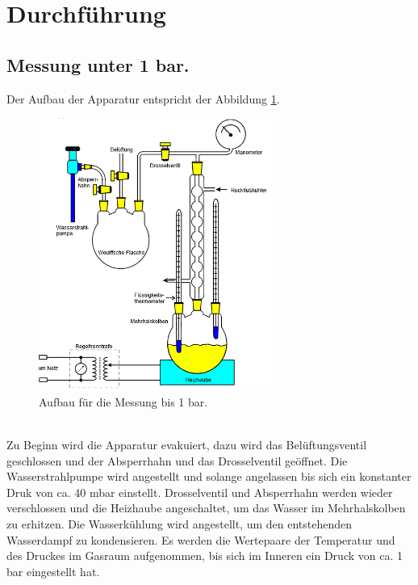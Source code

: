 \section{Durchführung}
\label{sec:Durchführung}
\subsection{Messung unter  1 bar.}
\label{sec:p<1}
Der Aufbau der Apparatur entspricht der Abbildung \ref{abb:aufbau1}.
\begin{figure}
  \centering
  \includegraphics[width=0.7\textwidth]{aufbau1.PNG}
  \caption{Aufbau für die Messung bis 1 bar.}
  \label{abb:aufbau1}
\end{figure}\\
Zu Beginn wird die Apparatur evakuiert, dazu wird das
Belüftungsventil geschlossen und der Absperrhahn und das
Drosselventil geöffnet. Die Wasserstrahlpumpe wird angestellt
und solange angelassen bis sich ein konstanter Druk von ca. 40 mbar einstellt.
Drosselventil und Absperrhahn werden wieder verschlossen und die Heizhaube angeschaltet, um das Wasser im Mehrhalskolben zu erhitzen.
Die Wasserkühlung wird angestellt, um den entstehenden Wasserdampf zu kondensieren.
Es werden die Wertepaare der Temperatur und des Druckes im Gasraum aufgenommen,
bis sich im Inneren ein Druck von ca. 1 bar eingestellt hat.
\newpage
